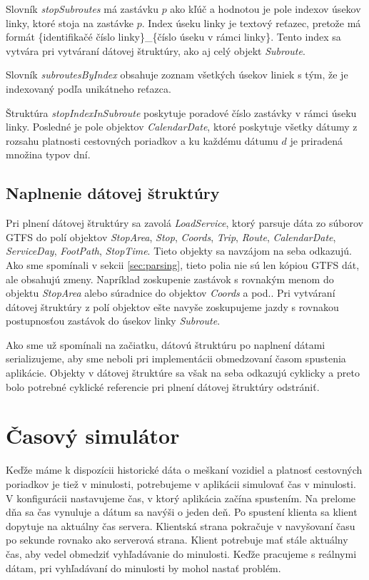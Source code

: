 Slovník \textit{stopSubroutes} má zastávku $p$ ako kľúč a hodnotou je pole indexov úsekov linky, ktoré stoja na zastávke $p$. Index úseku linky je textový reťazec, pretože má formát \{identifikačé číslo linky\}\_\{číslo úseku v rámci linky\}. Tento index sa vytvára pri vytváraní dátovej štruktúry, ako aj celý objekt \textit{Subroute}. 

Slovník \textit{subroutesByIndex} obsahuje zoznam všetkých úsekov liniek s tým, že je indexovaný podľa unikátneho reťazca.

Štruktúra \textit{stopIndexInSubroute} poskytuje poradové číslo zastávky v rámci úseku linky. Posledné je pole objektov \textit{CalendarDate}, ktoré poskytuje  všetky dátumy z rozsahu platnosti cestovných poriadkov a ku každému dátumu $d$ je priradená množina typov dní. 

\subsection{Naplnenie dátovej štruktúry}
Pri plnení dátovej štruktúry sa zavolá \textit{LoadService}, ktorý parsuje dáta zo súborov GTFS do polí objektov \textit{StopArea}, \textit{Stop}, \textit{Coords}, \textit{Trip}, \textit{Route}, \textit{CalendarDate}, \textit{ServiceDay}, \textit{FootPath}, \textit{StopTime}. Tieto objekty sa navzájom na seba odkazujú. Ako sme spomínali v sekcii \ref{sec:parsing}, tieto polia nie sú len kópiou GTFS dát, ale obsahujú zmeny. Napríklad zoskupenie zastávok s rovnakým menom do objektu \textit{StopArea} alebo súradnice do objektov \textit{Coords} a pod.. Pri vytváraní dátovej štruktúry z polí objektov ešte navyše zoskupujeme jazdy s rovnakou postupnosťou zastávok do úsekov linky \textit{Subroute}. 

Ako sme už spomínali na začiatku, dátovú štruktúru po naplnení dátami serializujeme, aby sme neboli pri implementácii obmedzovaní časom spustenia aplikácie. Objekty v dátovej štruktúre sa však na seba odkazujú cyklicky a preto bolo potrebné cyklické referencie pri plnení dátovej štruktúry odstrániť. 

\section{Časový simulátor}
Keďže máme k dispozícii historické dáta o meškaní vozidiel a platnosť cestovných poriadkov je tiež v minulosti, potrebujeme v aplikácii simulovať čas v minulosti. V konfigurácii nastavujeme čas, v ktorý aplikácia začína spustením. Na prelome dňa sa čas vynuluje a dátum sa navýši o jeden deň. 
Po spustení klienta sa klient dopytuje na aktuálny čas servera. Klientská strana pokračuje v navyšovaní času po sekunde rovnako ako serverová strana. Klient potrebuje mať stále aktuálny čas, aby vedel obmedziť vyhľadávanie do minulosti. Keďže pracujeme s reálnymi dátam, pri vyhľadávaní do minulosti by mohol nastať problém. 

